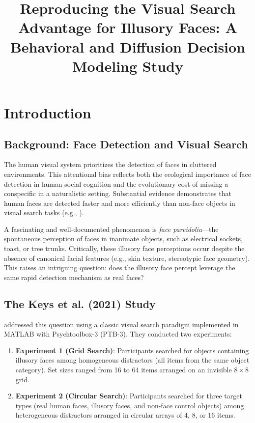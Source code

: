 \documentclass[stu,12pt,floatsintext]{apa7}
\title{Reproducing the Visual Search Advantage for Illusory Faces: A Behavioral and Diffusion Decision Modeling Study}%
\begin{document}
\maketitle
\sloppy

\section{Introduction}

\subsection{Background: Face Detection and Visual Search}

The human visual system prioritizes the detection of faces in cluttered environments. This attentional bias reflects both the ecological importance of face detection in human social cognition and the evolutionary cost of missing a conspecific in a naturalistic setting. Substantial evidence demonstrates that human faces are detected faster and more efficiently than non-face objects in visual search tasks (e.g., \textcite{Hershler2005,Wolfe2001}).

A fascinating and well-documented phenomenon is \textit{face pareidolia}—the spontaneous perception of faces in inanimate objects, such as electrical sockets, toast, or tree trunks. Critically, these illusory face perceptions occur despite the absence of canonical facial features (e.g., skin texture, stereotypic face geometry). This raises an intriguing question: does the illusory face percept leverage the same rapid detection mechanism as real faces?

\subsection{The Keys et al. (2021) Study}

\textcite{Keys2021} addressed this question using a classic visual search paradigm implemented in MATLAB with Psychtoolbox-3 (PTB-3). They conducted two experiments:

\begin{enumerate}
    \item \textbf{Experiment 1 (Grid Search)}: Participants searched for objects containing illusory faces among homogeneous distractors (all items from the same object category). Set sizes ranged from 16 to 64 items arranged on an invisible $8 \times 8$ grid.

    \item \textbf{Experiment 2 (Circular Search)}: Participants searched for three target types (real human faces, illusory faces, and non-face control objects) among heterogeneous distractors arranged in circular arrays of 4, 8, or 16 items.
\end{enumerate}
\end{document}

